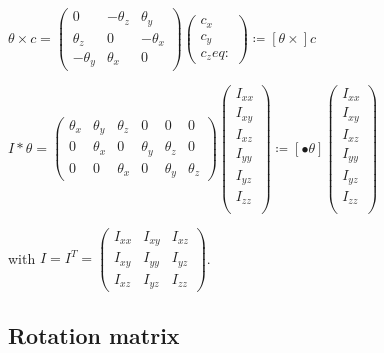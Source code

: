 \documentclass[\main/main.tex]{subfiles}
\begin{document}
{\centering
 $ \theta \times c =
 \begin{pmatrix}
  0         & -\theta_z & \theta_y  \\
  \theta_z  & 0         & -\theta_x \\
  -\theta_y & \theta_x  & 0
 \end{pmatrix}
 \begin{pmatrix}
  c_x \\
  c_y \\
  c_zeq:
 \end{pmatrix}
 \coloneqq \left[ \theta \times \right] c$
 \par}

{\centering
 $ I \ast \theta =
 \begin{pmatrix}
  \theta_x & \theta_y & \theta_z & 0        & 0        & 0        \\
  0        & \theta_x & 0        & \theta_y & \theta_z & 0        \\
  0        & 0        & \theta_x & 0        & \theta_y & \theta_z
 \end{pmatrix}
 \begin{pmatrix}
  I_{xx} \\
  I_{xy} \\
  I_{xz} \\
  I_{yy} \\
  I_{yz} \\
  I_{zz} \\
 \end{pmatrix}
 \coloneqq \left[ \bullet \theta \right]
 \begin{pmatrix}
  I_{xx} \\
  I_{xy} \\
  I_{xz} \\
  I_{yy} \\
  I_{yz} \\
  I_{zz} \\
 \end{pmatrix}$
 \par}

with $I = I^T =
\begin{pmatrix}
 I_{xx} & I_{xy} & I_{xz} \\
 I_{xy} & I_{yy} & I_{yz} \\
 I_{xz} & I_{yz} & I_{zz}
\end{pmatrix}
$.


\subsection{Rotation matrix}
\label{appendix:notation:rotation}
\end{document}

